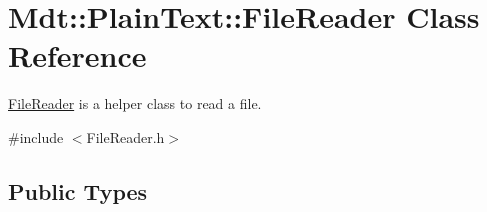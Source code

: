 \hypertarget{class_mdt_1_1_plain_text_1_1_file_reader}{}\section{Mdt\+:\+:Plain\+Text\+:\+:File\+Reader Class Reference}
\label{class_mdt_1_1_plain_text_1_1_file_reader}


\hyperlink{class_mdt_1_1_plain_text_1_1_file_reader}{File\+Reader} is a helper class to read a file.  




{\ttfamily \#include $<$File\+Reader.\+h$>$}

\subsection*{Public Types}
